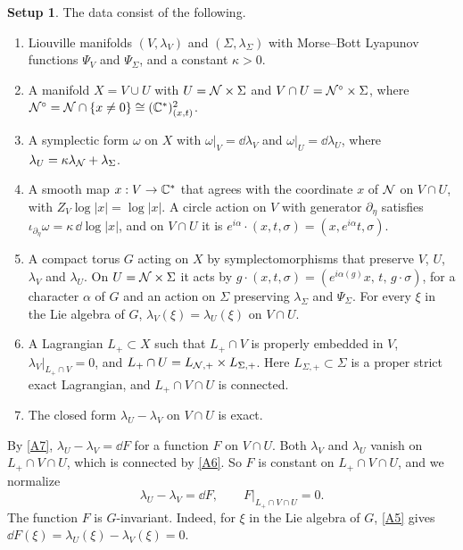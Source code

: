 \documentclass[12pt, letter]{amsart}
\theoremstyle{definition}
\newtheorem{setup}[dummy]{Setup}
\begin{document}
\begin{setup}\label{setup:attachment}
The data consist of the following.
\begin{enumerate}[label=\textup{(A\arabic*)}]
\item\label{A1} Liouville manifolds $(V,\lambda_V)$ and $(\Sigma,\lambda_\Sigma)$ with Morse--Bott Lyapunov functions $\Psi_V$ and $\Psi_\Sigma$, and a constant $\kappa>0$.


\item\label{A2} A manifold $X=V\cup U$ with $U=\mathcal{N}\times\Sigma$ and $V\cap U=\mathcal{N}^\circ\times\Sigma$, where $\mathcal{N}^\circ=\mathcal{N}\cap\{x\ne0\}\cong(\mathbb{C}^*)^2_{(x,t)}$.

\item\label{A3} A symplectic form $\omega$ on $X$ with $\omega|_V=\dd\lambda_V$ and $\omega|_U=\dd\lambda_U$, where $\lambda_U=\kappa\lambda_{\mathcal{N}}+\lambda_\Sigma$.

\item\label{A4} A smooth map $x:V\to\mathbb{C}^*$ that agrees with the coordinate $x$ of $\mathcal{N}$ on $V\cap U$, with $Z_V\log|x|=\log|x|$.
A circle action on $V$ with generator $\partial_\eta$ satisfies $\iota_{\partial_\eta}\omega=\kappa\,\dd\log|x|$, and on $V\cap U$ it is $e^{i\alpha}\cdot(x,t,\sigma)=(x,e^{i\alpha}t,\sigma)$.

\item\label{A5} A compact torus $G$ acting on $X$ by symplectomorphisms that preserve $V$, $U$, $\lambda_V$ and $\lambda_U$.
On $U = \mathcal{N} \times \Sigma $ it acts by $g\cdot(x,t,\sigma)=(e^{i\alpha(g)}x,\,t,\,g\cdot\sigma)$, for a character $\alpha$ of $G$ and an action on $\Sigma$ preserving $\lambda_\Sigma$ and $\Psi_\Sigma$.
For every $\xi$ in the Lie algebra of $G$, $\lambda_V(\xi)=\lambda_U(\xi)$ on $V\cap U$.

\item\label{A6} A Lagrangian $L_+\subset X$ such that $L_+\cap V$ is properly embedded in $V$, $\lambda_V|_{L_+\cap V}=0$, and $L_+\cap U=L_{\mathcal{N}, +} \times L_{\Sigma, +}$.
Here $L_{\Sigma, +}\subset\Sigma$ is a proper strict exact Lagrangian, and $L_+\cap V\cap U$ is connected.
\item\label{A7} The closed form $\lambda_U-\lambda_V$ on $V\cap U$ is exact.
\end{enumerate}

\end{setup}

By \ref{A7}, $\lambda_U-\lambda_V=\dd F$ for a function $F$ on $V\cap U$.
Both $\lambda_V$ and $\lambda_U$ vanish on $L_+\cap V\cap U$, which is connected by \ref{A6}.
So $F$ is constant on $L_+\cap V\cap U$, and we normalize
\begin{equation}\label{eq:normalization_F}
 \lambda_U-\lambda_V=\dd F,\qquad F|_{L_+\cap V\cap U}=0 .
\end{equation}
The function $F$ is $G$-invariant.
Indeed, for $\xi$ in the Lie algebra of $G$, \ref{A5} gives $\dd F(\xi)=\lambda_U(\xi)-\lambda_V(\xi)=0$.
\end{document}
